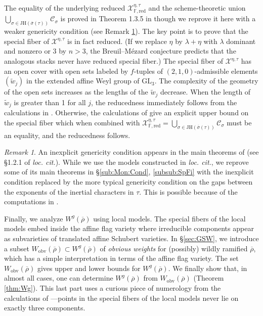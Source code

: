 \documentclass[oneside,a4paper,english, 11pt]{amsart}
\theoremstyle{plain}
\theoremstyle{plain}
\theoremstyle{plain}
\theoremstyle{plain}
\theoremstyle{plain}
\theoremstyle{plain}
\theoremstyle{definition}
\theoremstyle{definition}
\theoremstyle{definition}
\theoremstyle{remark}
\newtheorem{rmk}[thm]{Remark}
\numberwithin{equation}{section}
\newcommand{\F}{\mathbb{F}}
\newcommand{\cC}{\mathcal{C}}
\newcommand{\cX}{\mathcal{X}}
\newcommand{\GL}{\mathrm{GL}}
\newcommand{\tld}[1]{\widetilde{#1}}
\newcommand{\JH}{\mathrm{JH}}
\newcommand{\rhobar}{\overline{\rho}}
\newcommand{\ovl}[1]{\overline{#1}}
\begin{document}
The equality of the underlying reduced $\cX^{\eta, \tau}_{\F, \mathrm{red}}$ and the scheme-theoretic union $\bigcup_{\sigma \in \JH(\ovl{\sigma}(\tau))}\cC_\sigma$ is proved in Theorem 1.3.5 in \cite{MLM} though we reprove it here with a weaker genericity condition (see Remark \ref{rmk:genericity:prelim}).    The key point is to prove that the special fiber of  $\cX^{\eta,\tau}$ is in fact reduced.  (If we replace $\eta$ by $\lambda+\eta$ with $\lambda$ dominant and nonzero or $3$ by $n>3$, the Breuil--M\'ezard conjecture predicts that the analogous stacks never have reduced special fiber.)  The special fiber of $\cX^{\eta, \tau}$ has an open cover with open sets labeled by $f$-tuples of $(2,1,0)$-admissible elements $(\tld{w}_j)$ in the extended affine Weyl group of $\GL_3$.   The complexity of the geometry of the open sets increases as the lengths of the $\tld{w}_j$ decrease.
When the length of $\tld{w}_j$ is greater than 1 for all $j$, the reducedness immediately follows from the calculations in \cite[\S 5.3]{LLLM}.   
Otherwise, the calculations of \cite[\S 8]{LLLM}  give an explicit upper bound on the special fiber which when combined with  $\cX^{\eta, \tau}_{\F,\mathrm{red}} = \bigcup_{\sigma \in \JH(\ovl{\sigma}(\tau))}\cC_\sigma$ must be an equality, and the reducedness follows.  

\begin{rmk}\label{rmk:genericity:prelim} 
An inexplicit genericity condition appears in the main theorems of \cite{MLM} (see \S 1.2.1 of \emph{loc. cit.}).  While we use the models constructed in \emph{loc. cit.}, we reprove some of its main theorems in \S \ref{sub:Mon:Cond}, \ref{subsub:SpFi} with the inexplicit condition replaced by the more typical genericity condition on the gaps between the exponents of the inertial characters in $\tau$. 
This is possible because of the computations in 
\cite{LLLM, LLLM2}.
%
%
\end{rmk} 

Finally, we analyze $W^g(\rhobar)$ using local models. 
The special fibers of the local models embed inside the affine flag variety where irreducible components appear as subvarieties of translated affine Schubert varieties. 
In \S \ref{sec:GSW}, we introduce a subset $W_{\mathrm{obv}}(\rhobar)\subset W^g(\rhobar)$ of \emph{obvious weights} for (possibly) wildly ramified $\rhobar$, which has a simple interpretation in terms of the affine flag variety. 
The set $W_{\mathrm{obv}}(\rhobar)$ gives upper and lower bounds for $W^g(\rhobar)$. 
We finally show that, in almost all cases, one can determine $W^g(\rhobar)$ from $W_{\mathrm{obv}}(\rhobar)$ (Theorem \ref{thm:Wg}). 
This last part uses a curious piece of numerology from the calculations of \cite{LLLM}---points in the special fibers of the local models never lie on exactly three components. 
\end{document}
